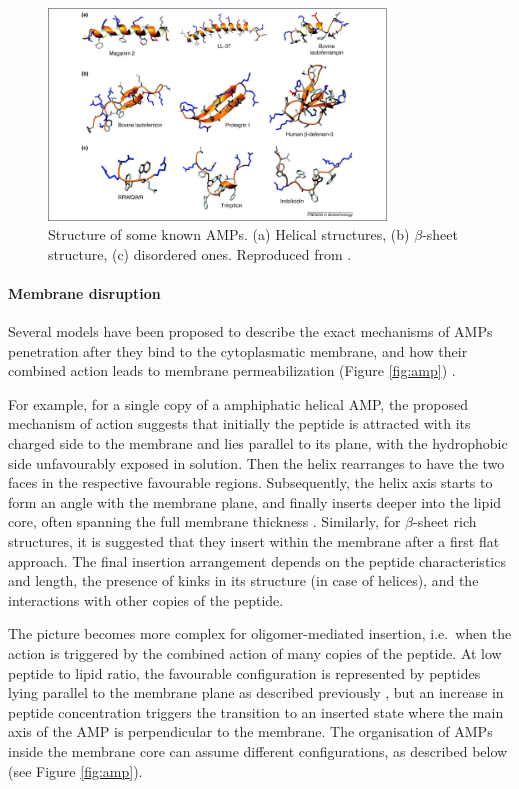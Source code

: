 \begin{figure}[t!]
\begin{center}
\includegraphics[width = 0.8\textwidth]{1introduction/pics/AMP_many.jpg}
\caption[Structure of some known AMPs.]{Structure of some known AMPs. (a) Helical structures, (b) $\beta$-sheet structure, (c) disordered ones. Reproduced from \citep{Nguyen2011}.} \label{fig:amp_structure}
\end{center}
\end{figure}


\paragraph{Membrane disruption} Several models have been proposed to describe the exact mechanisms of AMPs penetration after they bind to the cytoplasmatic membrane, and how their combined action leads to membrane permeabilization (Figure \ref{fig:amp}) \citep{Brogden2005,Nguyen2011}.

For example, for a single copy of a amphiphatic helical AMP, the proposed mechanism of action suggests that initially the peptide is attracted with its charged side to the membrane and lies parallel to its plane, with the hydrophobic side unfavourably exposed in solution. Then the helix rearranges to have the two faces in the respective favourable regions. Subsequently, the helix axis starts to form an angle with the membrane plane, and finally inserts deeper into the lipid core, often spanning the full membrane thickness \citep{Ebenhan2014}.
%
Similarly, for $\beta$-sheet rich structures, it is suggested that they insert within the membrane after a first flat approach.
%
The final insertion arrangement depends on the peptide characteristics and length, the presence of kinks in its structure (in case of helices), and the interactions with other copies of the peptide.

The picture becomes more complex for oligomer-mediated insertion, i.e.\ when the action is triggered by the combined action of many copies of the peptide.
%
At low peptide to lipid ratio, the favourable configuration is represented by peptides lying parallel to the membrane plane as described previously \citep{Yang2001}, but an increase in peptide concentration triggers the transition to an inserted state where the main axis of the AMP is perpendicular to the membrane. The organisation of AMPs inside the membrane core can assume different configurations, as described below \citep{Brogden2005,Nguyen2011,Ebenhan2014,Mahlapuu2016} (see Figure \ref{fig:amp}).

